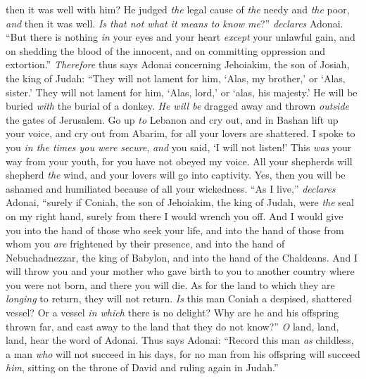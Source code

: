 \begin{biblechapter}
then it was well with him?
\verse He judged \textit{the} legal cause of \textit{the} needy and \textit{the} poor, 
\textit{and} then it was well. 
\textit{Is that not what it means to know me}?” \textit{declares} Adonai.
\verse “But there is nothing \textit{in} your eyes and your heart 
\textit{except} your unlawful gain, 
and on shedding the blood of the innocent, 
and on committing oppression and extortion.”
\verse \textit{Therefore} thus says Adonai concerning Jehoiakim, the son of Josiah, the king of Judah:
\verse “They will not lament for him, 
‘Alas, my brother,’ or ‘Alas, sister.’ 
They will not lament for him, 
‘Alas, lord,’ or ‘alas, his majesty.’
\verse He will be buried \textit{with} the burial of a donkey. 
\textit{He will be} dragged away and thrown \textit{outside} the gates of Jerusalem.
\verse Go up \textit{to} Lebanon and cry out, 
and in Bashan lift up your voice, 
and cry out from Abarim, 
for all your lovers are shattered.
\verse I spoke to you \textit{in the times you were secure}, 
\textit{and} you said, ‘I will not listen!’ 
This \textit{was} your way from your youth, 
for you have not obeyed my voice.
\verse All your shepherds will shepherd \textit{the} wind, 
and your lovers will go into captivity. 
Yes, then you will be ashamed and humiliated 
because of all your wickedness.
\verse “As I live,” \textit{declares} Adonai, “surely if Coniah, the son of Jehoiakim, the king of Judah, were \textit{the} seal on my right hand, surely from there I would wrench you off.
\verse And I would give you into the hand of those who seek your life, and into the hand of those from whom you \textit{are} frightened by their presence, and into the hand of Nebuchadnezzar, the king of Babylon, and into the hand of the Chaldeans.
\verse And I will throw you and your mother who gave birth to you to another country where you were not born, and there you will die.
\verse As for the land to which they are \textit{longing} to return, they will not return.
\verse \textit{Is} this man Coniah a despised, shattered vessel? 
Or a vessel \textit{in which} there is no delight? 
Why are he and his offspring thrown far, 
and cast away to the land that they do not know?”
\verse \textit{O} land, land, land, hear the word of Adonai.
\verse Thus says Adonai: “Record this man \textit{as} childless, 
a man \textit{who} will not succeed in his days, 
for no man from his offspring will succeed \textit{him}, 
sitting on the throne of David and ruling again in Judah.”
\end{biblechapter}

